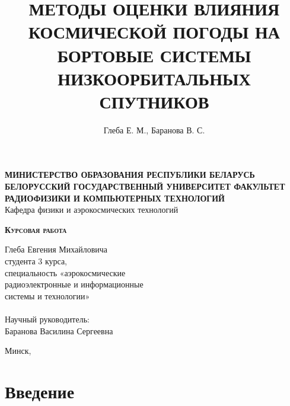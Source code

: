 \documentclass[12pt, a4paper]{extreport}
\title{МЕТОДЫ ОЦЕНКИ ВЛИЯНИЯ КОСМИЧЕСКОЙ ПОГОДЫ НА БОРТОВЫЕ СИСТЕМЫ НИЗКООРБИТАЛЬНЫХ СПУТНИКОВ}
\author{Глеба Е. М., Баранова В. С.}
\date{\the\year}
\begin{document}
\begin{titlepage}
    \begin{center}
        \Large \textbf{МИНИСТЕРСТВО ОБРАЗОВАНИЯ РЕСПУБЛИКИ БЕЛАРУСЬ БЕЛОРУССКИЙ ГОСУДАРСТВЕННЫЙ УНИВЕРСИТЕТ
            ФАКУЛЬТЕТ РАДИОФИЗИКИ И КОМПЬЮТЕРНЫХ ТЕХНОЛОГИЙ
        } \\
        Кафедра физики и аэрокосмических технологий
    \end{center}

    \vspace{5em}

    \begin{center}
        \Huge \textsc{\textbf{Курсовая работа}}
    \end{center}

    \begin{center}
        \Large \thetitle
    \end{center}

    \vspace{2em}

    \hfill
    \parbox{14em}{
        Глеба Евгения Михайловича \\
        студента 3 курса, \\
специальность «аэрокосмические \\
        радиоэлектронные и информационные \\
        системы и технологии» \\
        \\
        Научный руководитель: \\
        Баранова Василина Сергеевна \\
    }


    \begin{center}
        Минск, \thedate
    \end{center}

\end{titlepage}

\tableofcontents

\newpage

\section{Введение}
\end{document}

